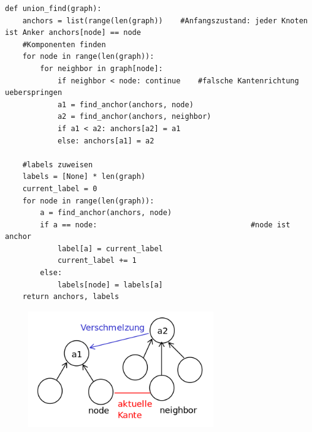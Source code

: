 \documentclass[11pt, fleqn]{scrreprt}
\begin{document}
            \begin{verbatim}
def union_find(graph):
    anchors = list(range(len(graph))    #Anfangszustand: jeder Knoten ist Anker anchors[node] == node
    #Komponenten finden
    for node in range(len(graph)):
        for neighbor in graph[node]:
            if neighbor < node: continue    #falsche Kantenrichtung ueberspringen
            a1 = find_anchor(anchors, node)
            a2 = find_anchor(anchors, neighbor)
            if a1 < a2: anchors[a2] = a1
            else: anchors[a1] = a2

    #labels zuweisen
    labels = [None] * len(graph)
    current_label = 0
    for node in range(len(graph)):
        a = find_anchor(anchors, node)
        if a == node:                                   #node ist anchor
            label[a] = current_label
            current_label += 1
        else:
            labels[node] = labels[a]
    return anchors, labels
            \end{verbatim}
    \begin{center}
        \includegraphics[width=10cm,height=5cm,keepaspectratio]{./Pictures/Verschmelzung.png}
    \end{center}
\end{document}

